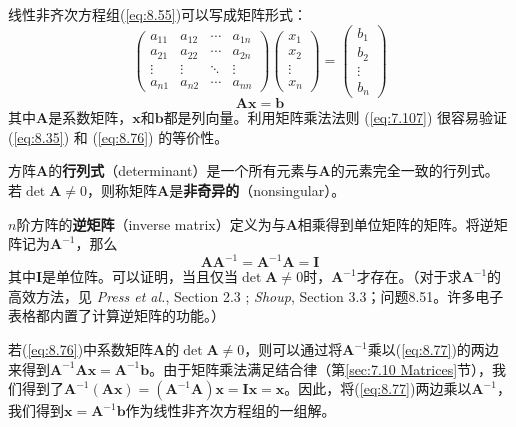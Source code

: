    线性非齐次方程组(\ref{eq:8.55})可以写成矩阵形式：
    \begin{equation}
        \begin{pmatrix}
            a_{11} & a_{12} & \cdots & a_{1n} \\
            a_{21} & a_{22} & \cdots & a_{2n} \\
            \vdots & \vdots & \ddots & \vdots \\
            a_{n1} & a_{n2} & \cdots & a_{nn}
        \end{pmatrix} \begin{pmatrix}
            x_1 \\
            x_2 \\
            \vdots \\
            x_n
        \end{pmatrix} = \begin{pmatrix}
            b_1 \\
            b_2 \\
            \vdots \\
            b_n
        \end{pmatrix}
        \label{eq:8.76}
    \end{equation}
    \begin{equation}
        \mathbf{A} \mathbf{x} = \mathbf{b}
        \label{eq:8.77}
    \end{equation}
    其中$\mathbf{A}$是系数矩阵，$\mathbf{x}$和$\mathbf{b}$都是列向量。利用矩阵乘法法则 (\ref{eq:7.107}) 很容易验证 (\ref{eq:8.35}) 和 (\ref{eq:8.76}) 的等价性。

    方阵$\mathbf{A}$的\textbf{行列式}（determinant）是一个所有元素与$\mathbf{A}$的元素完全一致的行列式。若$\det\mathbf{A} \neq 0$，则称矩阵$\mathbf{A}$是\textbf{非奇异的}（nonsingular）。

    $n$阶方阵的\textbf{逆矩阵}（inverse matrix）定义为与$\mathbf{A}$相乘得到单位矩阵的矩阵。将逆矩阵记为$\mathbf{A}^{-1}$，那么
    \begin{equation}
        \boxed{
            \mathbf{A}\mathbf{A}^{-1} = \mathbf{A}^{-1}\mathbf{A} = \mathbf{I}
        }
        \label{eq:8.78}
    \end{equation}
    其中$\mathbf{I}$是单位阵。可以证明，当且仅当$\det\mathbf{A} \neq 0$时，$\mathbf{A}^{-1}$才存在。（对于求$\mathbf{A}^{-1}$的高效方法，见 \textit{Press et al.}, Section 2.3 ; \textit{Shoup}, Section 3.3；问题8.51。许多电子表格都内置了计算逆矩阵的功能。）

    若(\ref{eq:8.76})中系数矩阵$\mathbf{A}$的$\det \mathbf{A} \neq 0$，则可以通过将$\mathbf{A}^{-1}$乘以(\ref{eq:8.77})的两边来得到$\mathbf{A}^{-1}\mathbf{A}\mathbf{x} = \mathbf{A}^{-1}\mathbf{b}$。由于矩阵乘法满足结合律（第\ref{sec:7.10 Matrices}节），我们得到了$\mathbf{A}^{-1}\left(\mathbf{Ax}\right) = \left(\mathbf{A}^{-1}\mathbf{A}\right)\mathbf{x} = \mathbf{I}\mathbf{x} = \mathbf{x}$。因此，将(\ref{eq:8.77})两边乘以$\mathbf{A}^{-1}$，我们得到$\mathbf{x} = \mathbf{A}^{-1}\mathbf{b}$作为线性非齐次方程组的一组解。

